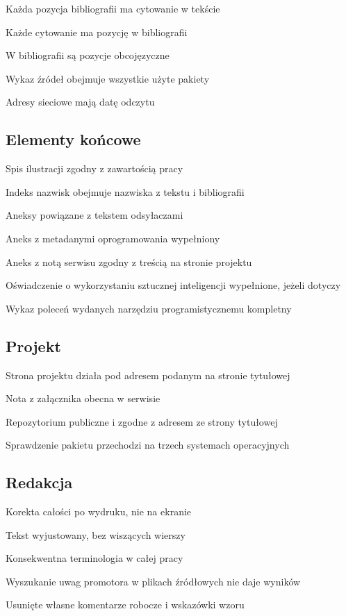 \begin{kontrolna}
\item Każda pozycja bibliografii ma cytowanie w tekście
\item Każde cytowanie ma pozycję w bibliografii
\item W bibliografii są pozycje obcojęzyczne
\item Wykaz źródeł obejmuje wszystkie użyte pakiety
\item Adresy sieciowe mają datę odczytu
\end{kontrolna}

\subsection*{Elementy końcowe}

\begin{kontrolna}
\item Spis ilustracji zgodny z zawartością pracy
\item Indeks nazwisk obejmuje nazwiska z tekstu i bibliografii
\item Aneksy powiązane z tekstem odsyłaczami
\item Aneks z metadanymi oprogramowania wypełniony
\item Aneks z notą serwisu zgodny z treścią na stronie projektu
\item Oświadczenie o wykorzystaniu sztucznej inteligencji wypełnione, jeżeli dotyczy
\item Wykaz poleceń wydanych narzędziu programistycznemu kompletny
\end{kontrolna}

\subsection*{Projekt}

\begin{kontrolna}
\item Strona projektu działa pod adresem podanym na stronie tytułowej
\item Nota z załącznika obecna w serwisie
\item Repozytorium publiczne i zgodne z adresem ze strony tytułowej
\item Sprawdzenie pakietu przechodzi na trzech systemach operacyjnych
\end{kontrolna}

\subsection*{Redakcja}

\begin{kontrolna}
\item Korekta całości po wydruku, nie na ekranie
\item Tekst wyjustowany, bez wiszących wierszy
\item Konsekwentna terminologia w całej pracy
\item Wyszukanie uwag promotora w plikach źródłowych nie daje wyników
\item Usunięte własne komentarze robocze i wskazówki wzoru
\end{kontrolna}
